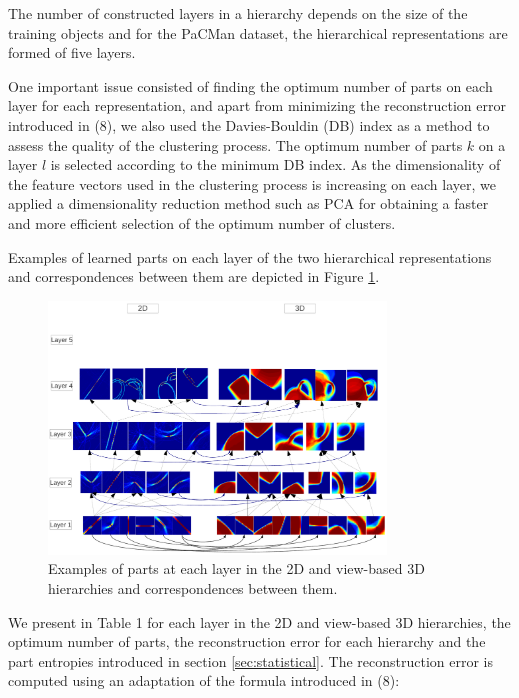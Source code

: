 \documentclass[runningheads]{llncs}
\begin{document}
The number of constructed layers in a hierarchy depends on the size of the training objects and for the PaCMan dataset, the hierarchical representations are formed of five layers. 

One important issue consisted of finding the optimum number of parts on each layer for each representation, and apart from minimizing the reconstruction error introduced in (8), we also used the Davies-Bouldin (DB) index \cite{Bouldin97} as a method to assess the quality of the clustering process. The optimum number of parts $k$ on a layer $l$ is selected according to the minimum DB index. As the dimensionality of the feature vectors used in the clustering process is increasing on each layer, we applied a dimensionality reduction method such as PCA for obtaining a faster and more efficient selection of the optimum number of clusters.

Examples of learned parts on each layer of the two hierarchical representations and correspondences between them are depicted in Figure \ref{hierarchy}.

\begin{figure}
\begin{center}
\includegraphics[width=0.8\textwidth]{hierarchy}
\end{center}
\caption{Examples of parts at each layer in the 2D and view-based 3D hierarchies and correspondences between them.}
\label{hierarchy}
\end{figure}

We present in Table 1 for each layer in the 2D and view-based 3D hierarchies, the optimum number of parts, the reconstruction error for each hierarchy and the part entropies introduced in section \ref{sec:statistical}. The reconstruction error is computed using an adaptation of the formula introduced in (8):
\end{document}
